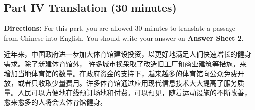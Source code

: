 \documentclass[UTF8,11pt]{ctexart}
\begin{document}
\subsection*{\textbf{Part IV} \textbf{Translation} \textbf{(30 minutes)}}


\textbf{Directions:} For this part, you are allowed 30 minutes to translate a passage from Chinese into English. You should write your answer on\textbf{ Answer Sheet 2}.


近年来，中国政府进一步加大体育馆建设投资，以更好地满足人们快速增长的健身需求。除了新建体育馆外， 许多城市换采取了改造旧工厂和商业建筑等措施，来增加当地体育馆的数量。在政府资金的支持下，越来越多的体育馆向公众免费开放，或者只收取少量费用。许多体育馆通过应用现代信息技术大大提高了服务质量。人民可以方便地在线预订场地和付费。可以预见，随着运动设施的不断改善，愈来愈多的人将会去体育馆健身。
\end{document}
